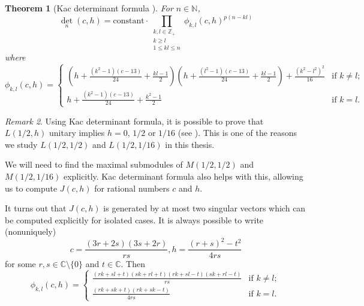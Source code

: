\documentclass[a4paper, 12pt, reqno]{amsart}
\newtheorem{theorem}{Theorem}[section]
\theoremstyle{remark}
\newtheorem{remark}[theorem]{Remark}
\numberwithin{equation}{subsection}
\begin{document}
\begin{theorem}[Kac determinant formula {\cite[Theorem 4.2]{iohara_representation_2011}}]
  \label{thr:32}
  For $n \in \mathbb{N}$,
  \begin{equation*}
    \textstyle\det_n(c, h) = \displaystyle\text{constant}\cdot \prod_{\substack{k, l \in \mathbb{Z}_+ \\ k \ge l \\ 1 \le kl \le n}} \phi_{k, l}(c, h)^{p(n - kl)}
  \end{equation*}
  where
  \begin{equation*}
    \phi_{k, l}(c, h)=
    \begin{cases}
      (h + \frac{(k^2 - 1)(c - 13)}{24} + \frac{kl - 1}{2})(h + \frac{(l^2 - 1)(c - 13)}{24} + \frac{kl - 1}{2}) + \frac{(k^2 - l^2)^2}{16} &\text{if }k \neq l;\\
      h + \frac{(k^2 - 1)(c - 13)}{24} + \frac{k^2 - 1}{2} &\text{if }k = l.
    \end{cases}
  \end{equation*}
\end{theorem}

\begin{remark}
  \label{rmk:27}
  Using Kac determinant formula, it is possible to prove that $L(1/2, h)$ unitary implies $h = 0$, $1/2$ or $1/16$ (see \cite[\S3]{kac_bombay_2013}).
  This is one of the reasons we study $L(1/2, 1/2)$ and $L(1/2, 1/16)$ in this thesis.
\end{remark}

We will need to find the maximal submodules of $M(1/2, 1/2)$ and $M(1/2, 1/16)$ explicitly.
Kac determinant formula also helps with this, allowing us to compute $J(c, h)$ for rational numbers $c$ and $h$.

It turns out that $J(c, h)$ is generated by at most two singular vectors which can be computed explicitly for isolated cases.
It is always possible to write (nonuniquely)
\begin{equation*}
  c = \frac{(3r + 2s)(3s + 2r)}{rs}, h = \frac{(r + s)^2 - t^2}{4rs}
\end{equation*}
for some $r, s \in \mathbb{C} \setminus \{0\}$ and $t \in \mathbb{C}$.
Then
\begin{equation*}
  \phi_{k, l}(c, h) =
  \begin{cases}
    \frac{(rk + sl + t)(sk + rl + t)(rk + sl - t)(sk + rl - t)}{rs} &\text{if }k \neq l;\\
    \frac{(rk + sk + t)(rk + sk - t)}{4rs} &\text{if }k = l.
  \end{cases}
\end{equation*}
\end{document}
